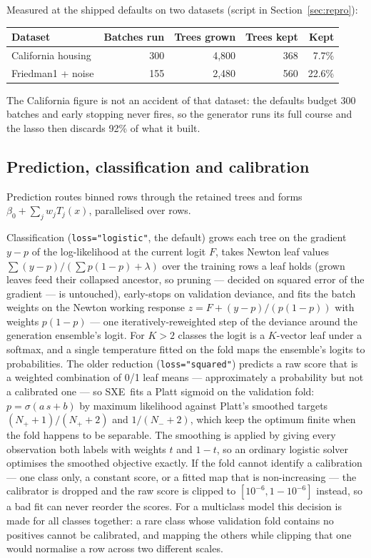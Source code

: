 \documentclass[11pt,a4paper]{article}
\newcommand{\code}[1]{\texttt{\small #1}}
\newcommand{\SXE}{\textsc{SXE}}
\theoremstyle{definition}
\begin{document}
Measured at the shipped defaults on two datasets (script in
Section~\ref{sec:repro}):

\begin{center}
\begin{tabular}{lrrrr}
\toprule
Dataset & Batches run & Trees grown & Trees kept & Kept \\
\midrule
California housing & 300 & 4{,}800 & 368 & 7.7\% \\
Friedman1 + noise & 155 & 2{,}480 & 560 & 22.6\% \\
\bottomrule
\end{tabular}
\end{center}

\noindent The California figure is not an accident of that dataset: the defaults
budget 300 batches and early stopping never fires, so the generator runs its full
course and the lasso then discards 92\% of what it built.

\subsection{Prediction, classification and calibration}\label{sec:predict}

Prediction routes binned rows through the retained trees and forms
$\beta_0 + \sum_j w_j T_j(x)$, parallelised over rows.

Classification (\code{loss="logistic"}, the default) grows each tree on the
gradient $y - p$ of the log-likelihood at the current logit $F$, takes Newton
leaf values $\sum (y-p) / (\sum p(1-p) + \lambda)$ over the training rows a
leaf holds (grown leaves feed their collapsed ancestor, so pruning --- decided
on squared error of the gradient --- is untouched), early-stops on validation
deviance, and fits the batch weights on the Newton working response
$z = F + (y-p)/(p(1-p))$ with weights $p(1-p)$ --- one iteratively-reweighted
step of the deviance around the generation ensemble's logit. For $K > 2$
classes the logit is a $K$-vector leaf under a softmax, and a single
temperature fitted on the fold maps the ensemble's logits to probabilities.
The older reduction (\code{loss="squared"}) predicts a raw score that is a
weighted combination of 0/1 leaf means --- approximately a probability but not
a calibrated one --- so \SXE\ fits a Platt sigmoid \cite{platt1999} on the
validation fold: $p = \sigma(a\,s + b)$ by maximum likelihood against Platt's
smoothed targets $(N_+{+}1)/(N_+{+}2)$ and $1/(N_-{+}2)$, which keep the
optimum finite when the fold happens to be separable. The smoothing is applied
by giving every observation both labels with weights $t$ and $1-t$, so an
ordinary logistic solver optimises the smoothed objective exactly. If the fold
cannot identify a calibration --- one class only, a constant score, or a fitted
map that is non-increasing --- the calibrator is dropped and the raw score is
clipped to $[10^{-6}, 1-10^{-6}]$ instead, so a bad fit can never reorder the
scores. For a multiclass model this decision is made for all classes together:
a rare class whose validation fold contains no positives cannot be calibrated,
and mapping the others while clipping that one would normalise a row across
two different scales.
\end{document}
